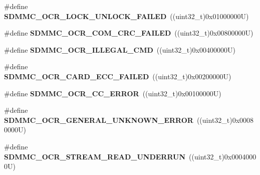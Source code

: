 \begin{DoxyCompactItemize}
\#define {\bfseries S\+D\+M\+M\+C\+\_\+\+O\+C\+R\+\_\+\+L\+O\+C\+K\+\_\+\+U\+N\+L\+O\+C\+K\+\_\+\+F\+A\+I\+L\+ED}~((uint32\+\_\+t)0x01000000\+U)
\item 
\mbox{\label{group___s_d_m_m_c___l_l___exported___constants_gad394637fbef55cd9bdffdf721d7f911a}} 
\#define {\bfseries S\+D\+M\+M\+C\+\_\+\+O\+C\+R\+\_\+\+C\+O\+M\+\_\+\+C\+R\+C\+\_\+\+F\+A\+I\+L\+ED}~((uint32\+\_\+t)0x00800000\+U)
\item 
\mbox{\label{group___s_d_m_m_c___l_l___exported___constants_ga4b57f2ff0eac4477f4fbcae44e033c84}} 
\#define {\bfseries S\+D\+M\+M\+C\+\_\+\+O\+C\+R\+\_\+\+I\+L\+L\+E\+G\+A\+L\+\_\+\+C\+MD}~((uint32\+\_\+t)0x00400000\+U)
\item 
\mbox{\label{group___s_d_m_m_c___l_l___exported___constants_ga4aa0f4204a988e90e740a2c1d4032b48}} 
\#define {\bfseries S\+D\+M\+M\+C\+\_\+\+O\+C\+R\+\_\+\+C\+A\+R\+D\+\_\+\+E\+C\+C\+\_\+\+F\+A\+I\+L\+ED}~((uint32\+\_\+t)0x00200000\+U)
\item 
\mbox{\label{group___s_d_m_m_c___l_l___exported___constants_ga6c54f6b8c399e0075709cbea655624c3}} 
\#define {\bfseries S\+D\+M\+M\+C\+\_\+\+O\+C\+R\+\_\+\+C\+C\+\_\+\+E\+R\+R\+OR}~((uint32\+\_\+t)0x00100000\+U)
\item 
\mbox{\label{group___s_d_m_m_c___l_l___exported___constants_gab63ff3fdd7837f8a25076e82ba2f7417}} 
\#define {\bfseries S\+D\+M\+M\+C\+\_\+\+O\+C\+R\+\_\+\+G\+E\+N\+E\+R\+A\+L\+\_\+\+U\+N\+K\+N\+O\+W\+N\+\_\+\+E\+R\+R\+OR}~((uint32\+\_\+t)0x00080000\+U)
\item 
\mbox{\label{group___s_d_m_m_c___l_l___exported___constants_ga01c81325b4a1960543b317c3fc212591}} 
\#define {\bfseries S\+D\+M\+M\+C\+\_\+\+O\+C\+R\+\_\+\+S\+T\+R\+E\+A\+M\+\_\+\+R\+E\+A\+D\+\_\+\+U\+N\+D\+E\+R\+R\+UN}~((uint32\+\_\+t)0x00040000\+U)
\item 
\mbox{\label{group___s_d_m_m_c___l_l___exported___constants_gac98c52963508d805426ab31d2409890e}} 

\end{DoxyCompactItemize}
